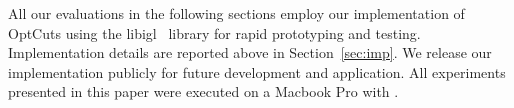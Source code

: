 All our evaluations in the following sections employ our implementation of OptCuts using the libigl~\cite{libigl} library for rapid prototyping and testing. Implementation details are reported above in Section~\ref{sec:imp}. We  release our implementation publicly for future development and application. All experiments presented in this paper were executed on a Macbook Pro with .


